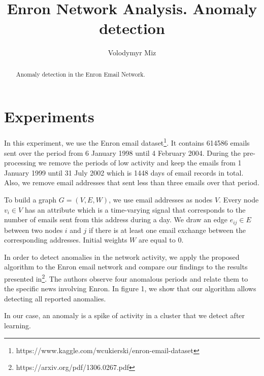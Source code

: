 \documentclass[]{article}
\title{Enron Network Analysis. Anomaly detection}
\author{Volodymyr Miz}
\begin{document}
\maketitle

\begin{abstract}
Anomaly detection in the Enron Email Network.
\end{abstract}

\section{Experiments}
In this experiment, we use the Enron email dataset\footnote{https://www.kaggle.com/wcukierski/enron-email-dataset}. It contains 614586 emails sent over the period from 6 January 1998 until 4 February 2004. During the pre-processing we remove the periods of low activity and keep the emails from 1 January 1999 until 31 July 2002 which is 1448 days of email records in total. Also, we remove email addresses that sent less than three emails over that period.

To build a graph \mbox{$G = (V,E,W)$}, we use email addresses as nodes $V$. Every node $v_i \in V$ has an attribute which is a time-varying signal that corresponds to the number of emails sent from this address during a day. We draw an edge $e_{ij} \in E$ between two nodes $i$ and $j$ if there is at least one email exchange between the corresponding addresses. Initial weights $W$ are equal to $0$.

In order to detect anomalies in the network activity, we apply the proposed algorithm to the Enron email network and compare our findings to the results presented in\footnote{https://arxiv.org/pdf/1306.0267.pdf}. The authors observe four anomalous periods and relate them to the specific news involving Enron. In figure 1, we show that our algorithm allows detecting all reported anomalies.

In our case, an anomaly is a spike of activity in a cluster that we detect after learning.
\end{document}
